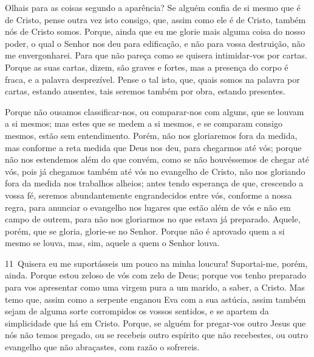 Olhais para as coisas segundo a aparência? Se alguém confia de si
mesmo que é de Cristo, pense outra vez isto consigo, que, assim como
ele é de Cristo, também nós de Cristo somos. Porque, ainda que
eu me glorie mais alguma coisa do nosso poder, o qual o Senhor nos
deu para edificação, e não para vossa destruição, não me
envergonharei. Para que não pareça como se quisera intimidar-vos
por cartas. Porque as suas cartas, dizem, são graves e
fortes, mas a presença do corpo é fraca, e a palavra desprezível.
Pense o tal isto, que, quais somos na palavra por cartas,
estando ausentes, tais seremos também por obra, estando presentes.

Porque não ousamos classificar-nos, ou comparar-nos com alguns,
que se louvam a si mesmos; mas estes que se medem a si mesmos, e se
comparam consigo mesmos, estão sem entendimento. Porém, não
nos gloriaremos fora da medida, mas conforme a reta medida que Deus
nos deu, para chegarmos até vós; porque não nos estendemos
além do que convém, como se não houvéssemos de chegar até vós, pois
já chegamos também até vós no evangelho de Cristo, não nos
gloriando fora da medida nos trabalhos alheios; antes tendo
esperança de que, crescendo a vossa fé, seremos abundantemente
engrandecidos entre vós, conforme a nossa regra, para
anunciar o evangelho nos lugares que estão além de vós e não em
campo de outrem, para não nos gloriarmos no que estava já preparado.
Aquele, porém, que se gloria, glorie-se no Senhor.
Porque não é aprovado quem a si mesmo se louva, mas, sim,
aquele a quem o Senhor louva.

\medskip

\lettrine{11}\ Quisera eu me suportásseis um pouco na minha
loucura! Suportai-me, porém, ainda. Porque estou zeloso de vós
com zelo de Deus; porque vos tenho preparado para vos apresentar
como uma virgem pura a um marido, a saber, a Cristo. Mas temo
que, assim como a serpente enganou Eva com a sua astúcia, assim
também sejam de alguma sorte corrompidos os vossos sentidos, e se
apartem da simplicidade que há em Cristo. Porque, se alguém for
pregar-vos outro Jesus que nós não temos pregado, ou se recebeis
outro espírito que não recebestes, ou outro evangelho que não
abraçastes, com razão o sofrereis.

